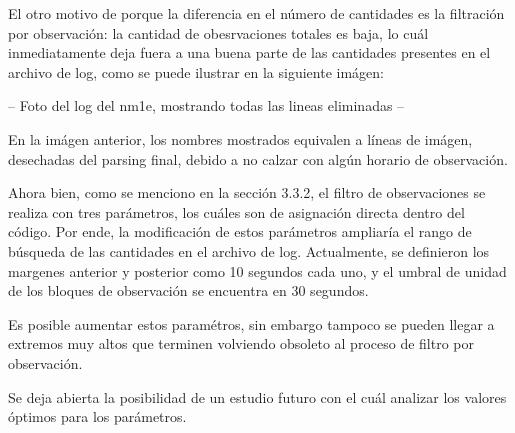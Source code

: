 El otro motivo de porque la diferencia en el número de cantidades es la filtración por observación: la cantidad de obesrvaciones totales es baja, lo cuál inmediatamente deja fuera a una buena parte de las cantidades presentes en el archivo de log, como se puede ilustrar en la siguiente imágen:

-- Foto del log del nm1e, mostrando todas las lineas eliminadas --

En la imágen anterior, los nombres mostrados equivalen a líneas de imágen, desechadas del parsing final, debido a no calzar con algún horario de observación.

Ahora bien, como se menciono en la sección 3.3.2, el filtro de observaciones se realiza con tres parámetros, los cuáles son de asignación directa dentro del código. Por ende, la modificación de estos parámetros ampliaría el rango de búsqueda de las cantidades en el archivo de log. Actualmente, se definieron los margenes anterior y posterior como 10 segundos cada uno, y el umbral de unidad de los bloques de observación se encuentra en 30 segundos.

Es posible aumentar estos paramétros, sin embargo tampoco se pueden llegar a extremos muy altos que terminen volviendo obsoleto al proceso de filtro por observación.

Se deja abierta la posibilidad de un estudio futuro con el cuál analizar los valores óptimos para los parámetros.